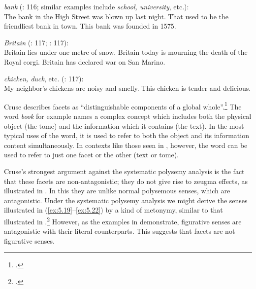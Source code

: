 \ea \label{ex:5.20}
 \textit{bank} (\citealt{Cruse2000}: 116; similar examples include \textit{school, university}, etc.):\\
\ea The bank in the High Street was blown up last night.  
\ex That used to be the friendliest bank in town.         
\ex This bank was founded in 1575.                        
                       \z
\z

\ea \label{ex:5.21} \textit{Britain} (\citealt{Cruse2000}: 117; \citealt{CroftCruse2004}: 117):\\
\ea Britain lies under one metre of snow.                    
\ex Britain today is mourning the death of the Royal corgi.  
\ex Britain has declared war on San Marino.                  
                       \z
\z

\ea \label{ex:5.22}
\textit{chicken, duck}, etc. (\citealt{CroftCruse2004}: 117):\\
\ea My neighbor’s chickens are noisy and smelly.  
\ex This chicken is tender and delicious.         
                       \z
\z


Cruse describes facets as “distinguishable components of a global whole”.\footnote{\citet[116]{CroftCruse2004}.} The word \textit{book} for example names a complex concept which includes both the physical object (the tome) and the information which it contains (the text). In the most typical uses of the word, it is used to refer to both the object and its information content simultaneously. In contexts like those seen in , however, the word can be used to refer to just one facet or the other (text or tome).



Cruse’s strongest argument against the systematic polysemy analysis is the fact that these facets are non-antagonistic; they do not give rise to zeugma effects, as illustrated in . In this they are unlike normal polysemous senses, which are antagonistic. Under the systematic polysemy analysis we might derive the senses illustrated in (\ref{ex:5.19}--\ref{ex:5.22}) by a kind of metonymy, similar to that illustrated in .\footnote{\citet{Nunberg1979,Nunberg1995}.} However, as the examples in  demonstrate, figurative senses are antagonistic with their literal counterparts. This suggests that facets are not figurative senses.


